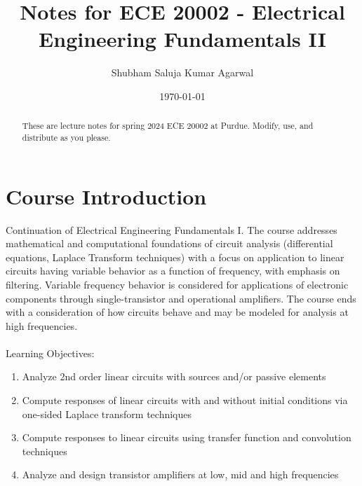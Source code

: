 \documentclass[nobib]{tufte-handout}
\title{Notes for ECE 20002 - Electrical Engineering Fundamentals II}
\author[Shubham Saluja Kumar Agarwal]{Shubham Saluja Kumar Agarwal}
\date{\today}  %
\begin{document}
\maketitle

\begin{abstract}
    These are lecture notes for spring 2024 ECE 20002 at Purdue. Modify, use, and distribute as you please.
\end{abstract}

\tableofcontents

\section{Course Introduction}

Continuation of Electrical Engineering Fundamentals I. The course addresses
mathematical and computational foundations of circuit analysis (differential
equations, Laplace Transform techniques) with a focus on application to linear
circuits having variable behavior as a function of frequency, with emphasis on
filtering. Variable frequency behavior is considered for applications of
electronic components through single-transistor and operational amplifiers. The
course ends with a consideration of how circuits behave and may be modeled for
analysis at high frequencies.\\~\\ Learning Objectives:
\begin{enumerate}
    \item Analyze 2nd order linear circuits with sources and/or passive elements
    \item Compute responses of linear circuits with and without initial conditions via
          one-sided Laplace transform techniques
    \item Compute responses to linear circuits using transfer function and convolution
          techniques
    \item Analyze and design transistor amplifiers at low, mid and high frequencies
\end{enumerate}

\pagebreak
\end{document}
